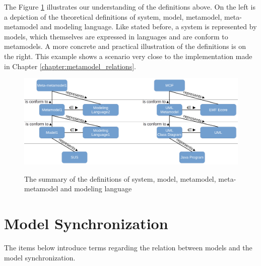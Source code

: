 \documentclass[tuberlin,cic,tc,english,noabntcite,oneside]{iiufrgs}
\begin{document}
	The Figure \ref{fig:model_scheme} illustrates our understanding of the definitions above. On the left is a depiction of the theoretical definitions of system, model, metamodel, meta-metamodel and modeling language. Like stated before, a system is represented by models, which themselves are expressed in languages and are conform to metamodels. A more concrete and practical illustration of the definitions is on the right. This example shows a scenario very close to the implementation made in Chapter \ref{chapter:metamodel_relations}.
	
	\begin{figure}[H]
		\centering
		\caption{The summary of the definitions of system, model, metamodel, meta-metamodel and modeling language}
		\includegraphics[width=\textwidth]{model_scheme}
		\label{fig:model_scheme}
	\end{figure}
	
\section{Model Synchronization}
The items below introduce terms regarding the relation between models and the model synchronization.
\end{document}
